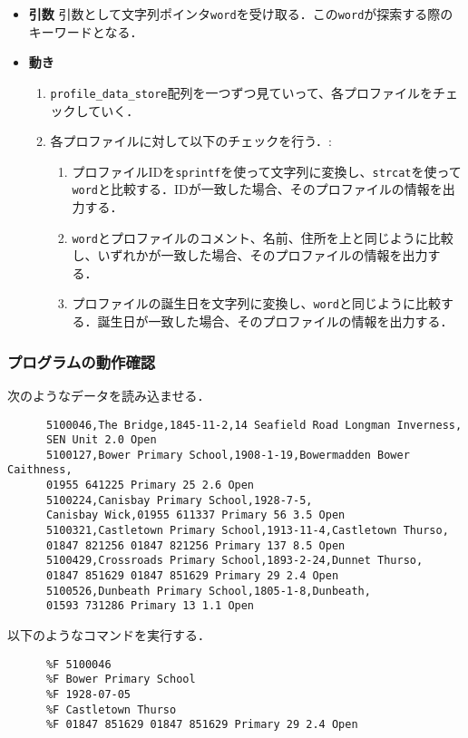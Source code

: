       \begin{itemize}
        \item \textbf{引数} 引数として文字列ポインタ\texttt{word}を受け取る．この\texttt{word}が探索する際のキーワードとなる．
        \item \textbf{動き}
        \begin{enumerate}
          \item \texttt{profile\_data\_store}配列を一つずつ見ていって、各プロファイルをチェックしていく．
          \item 各プロファイルに対して以下のチェックを行う．:
          \begin{enumerate}
            \item プロファイルIDを\texttt{sprintf}を使って文字列に変換し、\texttt{strcat}を使って\texttt{word}と比較する．IDが一致した場合、そのプロファイルの情報を出力する．
            \item \texttt{word}とプロファイルのコメント、名前、住所を上と同じように比較し、いずれかが一致した場合、そのプロファイルの情報を出力する．
            \item プロファイルの誕生日を文字列に変換し、\texttt{word}と同じように比較する．誕生日が一致した場合、そのプロファイルの情報を出力する．
          \end{enumerate}
        \end{enumerate}
      \end{itemize}
      \subsubsection{プログラムの動作確認}
      次のようなデータを読み込ませる．
      \begin{verbatim}
      5100046,The Bridge,1845-11-2,14 Seafield Road Longman Inverness,
      SEN Unit 2.0 Open
      5100127,Bower Primary School,1908-1-19,Bowermadden Bower Caithness,
      01955 641225 Primary 25 2.6 Open
      5100224,Canisbay Primary School,1928-7-5,
      Canisbay Wick,01955 611337 Primary 56 3.5 Open
      5100321,Castletown Primary School,1913-11-4,Castletown Thurso,
      01847 821256 01847 821256 Primary 137 8.5 Open
      5100429,Crossroads Primary School,1893-2-24,Dunnet Thurso,
      01847 851629 01847 851629 Primary 29 2.4 Open
      5100526,Dunbeath Primary School,1805-1-8,Dunbeath,
      01593 731286 Primary 13 1.1 Open
      \end{verbatim}
      \clearpage
      以下のようなコマンドを実行する．
      \begin{verbatim}
      %F 5100046
      %F Bower Primary School
      %F 1928-07-05
      %F Castletown Thurso
      %F 01847 851629 01847 851629 Primary 29 2.4 Open
      \end{verbatim}
      

